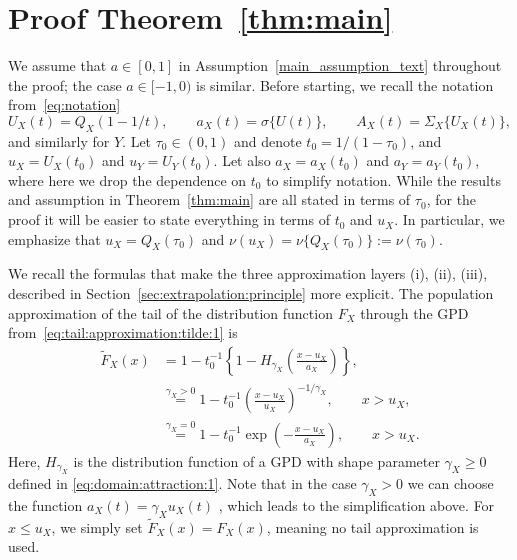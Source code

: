 \documentclass{statsoc}
\theoremstyle{break}
\newcommand{\tauzero}{\tau_0}
\begin{document}
\section{Proof Theorem~\ref{thm:main}}\label{sec:proof:thm:main}

We assume that $a \in [0,1]$ in Assumption~\ref{main_assumption_text} throughout the proof; the case $a\in[-1,0)$ is similar.
Before starting, we recall the notation from~\eqref{eq:notation}
\begin{equation*}
U_X(t) = Q_X(1 - 1/t), \qquad a_X(t) = \sigma\{U(t)\}, \qquad  A_X(t)  = \Sigma_X\{U_X(t)\},
\end{equation*}
and similarly for $Y$.
Let $\tauzero \in (0,1)$ and denote $t_0 =  1/(1-\tauzero)$, 
and $ u_X = U_X(t_0)$ and $u_Y = U_Y(t_0)$.
Let also $a_X = a_X(t_0)$ and $a_Y = a_Y(t_0)$, where here we drop the dependence on $t_0$ to simplify notation. 
While the results and assumption in Theorem~\ref{thm:main} are all stated in terms of $\tauzero$, for the proof it will be easier to state everything in terms of $t_0$ and $u_X$. In particular, we emphasize that 
$u_X = Q_X(\tauzero)$ and $\nu(u_X)= \nu\{Q_X(\tauzero)\} := \nu(\tauzero)$.


We recall the formulas that make the three approximation layers (i), (ii), (iii), described in Section~\ref{sec:extrapolation:principle} more explicit.
The population approximation of the tail of the distribution function $F_X$ through the GPD from~\eqref{eq:tail:approximation:tilde:1} is 
\begin{align*}
	\tilde F_X(x) &= 1 - t_0^{-1}\left\{ 1 - H_{\gamma_X}\left(\frac{x - u_X}{a_X}\right) \right\}, \\
	& \stackrel{\gamma_X > 0}{=} 1 - t_0^{-1} \left(\frac{x-u_X}{u_X}\right)^{-1/\gamma_X} , \qquad x > u_X, \\
	& \stackrel{\gamma_X = 0}{=} 1 - t_0^{-1} \exp \left(-\frac{x - u_X}{a_X}\right), \qquad x > u_X .
\end{align*}
 Here, $H_{\gamma_X}$ is the distribution function of a GPD with shape parameter $\gamma_X \geq 0$ defined in \eqref{eq:domain:attraction:1}. 
Note that in the case $\gamma_X > 0$ we can choose the function $a_X(t) = \gamma_X u_X(t)$ \citep[][Theorem B.2.2]{dehaan:ferreira:2006}, which leads to the simplification above.
For $x \leq u_X$, we simply set $\tilde F_X(x) = F_X(x)$, meaning no tail approximation is used. 
\end{document}
